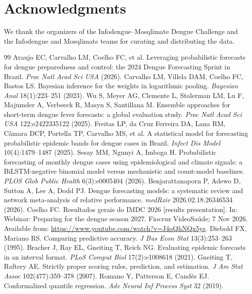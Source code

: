 \documentclass[11pt]{article}
\begin{document}
\section*{Acknowledgments}
We thank the organizers of the Infodengue--Mosqlimate Dengue Challenge and the Infodengue and
Mosqlimate teams for curating and distributing the data.


\begin{thebibliography}{99}
\small
{} Araujo EC, Carvalho LM, Coelho FC, et al. Leveraging probabilistic forecasts for dengue preparedness and control: the 2024 Dengue Forecasting Sprint in Brazil. \emph{Proc Natl Acad Sci USA} (2026).
 Carvalho LM, Villela DAM, Coelho FC, Bastos LS. Bayesian inference for the weights in logarithmic pooling. \emph{Bayesian Anal} 18(1):223--251 (2023).
 Wu S, Meyer AG, Clemente L, Stolerman LM, Lu F, Majumder A, Verbeeck R, Masyn S, Santillana M. Ensemble approaches for short-term dengue fever forecasts: a global evaluation study. \emph{Proc Natl Acad Sci USA} 122:e2422335122 (2025).
 Freitas LP, da Cruz Ferreira DA, Lana RM, C\^amara DCP, Portella TP, Carvalho MS, et al. A statistical model for forecasting probabilistic epidemic bands for dengue cases in Brazil. \emph{Infect Dis Model} 10(4):1479--1487 (2025).
 Sesay MM, Ngunyi A, Imboga H. Probabilistic forecasting of monthly dengue cases using epidemiological and climate signals: a BiLSTM-negative binomial model versus mechanistic and count-model baselines. \emph{PLOS Glob Public Health} 6(3):e0005404 (2026).
 Benjarattanaporn P, Adewo D, Sutton A, Lee A, Dodd PJ. Dengue forecasting models: a systematic review and network meta-analysis of relative performance. \emph{medRxiv} 2026.02.18.26346534 (2026).
 Coelho FC. Resultados gerais do IMDC 2026 [results presentation]. In: Webinar: Preparing for the dengue season 2027. Fiocruz VideoSa\'ude; 7 Nov 2026. Available from: \url{https://www.youtube.com/watch?v=J4qQhNQx5ys}.
 Diebold FX, Mariano RS. Comparing predictive accuracy. \emph{J Bus Econ Stat} 13(3):253--263 (1995).
 Bracher J, Ray EL, Gneiting T, Reich NG. Evaluating epidemic forecasts in an interval format. \emph{PLoS Comput Biol} 17(2):e1008618 (2021).
 Gneiting T, Raftery AE. Strictly proper scoring rules, prediction, and estimation. \emph{J Am Stat Assoc} 102(477):359--378 (2007).
 Romano Y, Patterson E, Cand\`es EJ. Conformalized quantile regression. \emph{Adv Neural Inf Process Syst} 32 (2019).

\end{thebibliography}
\end{document}
